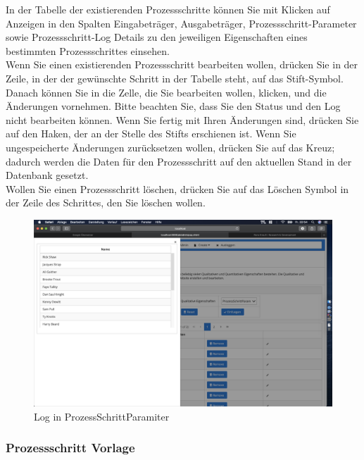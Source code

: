 \documentclass[enabledeprecatedfontcommands,fontsize=12pt,paper=a4,twoside]{scrartcl}
\begin{document}
In der Tabelle der existierenden Prozessschritte können Sie mit Klicken auf Anzeigen in den Spalten Eingabeträger, Ausgabeträger, Prozessschritt-Parameter sowie Prozessschritt-Log Details zu den jeweiligen Eigenschaften eines bestimmten Prozessschrittes einsehen. \\

Wenn Sie einen existierenden Prozessschritt bearbeiten wollen, drücken Sie in der Zeile, in der der gewünschte Schritt in der Tabelle steht, auf das Stift-Symbol. Danach können Sie in die Zelle, die Sie bearbeiten wollen, klicken, und die Änderungen vornehmen. Bitte beachten Sie, dass Sie den Status und den Log nicht bearbeiten können. Wenn Sie fertig mit Ihren Änderungen sind, drücken Sie auf den Haken, der an der Stelle des Stifts erschienen ist. Wenn Sie ungespeicherte Änderungen zurücksetzen wollen, drücken Sie auf das Kreuz; dadurch werden die Daten für den Prozessschritt auf den aktuellen Stand in der Datenbank gesetzt. \\


Wollen Sie einen Prozessschritt löschen, drücken Sie auf das Löschen Symbol in der Zeile des Schrittes, den Sie löschen wollen. \\

\begin{figure}[h!]
\begin{center}
 \includegraphics[width=\textwidth]{screenshots/pk/334Log.png}
  \caption{Log in ProzessSchrittParamiter}
  \label{fig:boat2}
\end{center}
\end{figure}

\subsubsection{Prozessschritt Vorlage}
\end{document}
